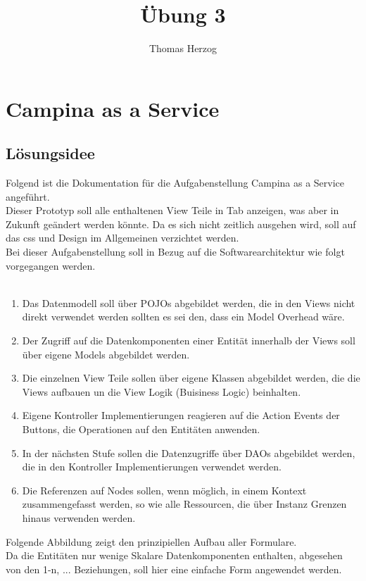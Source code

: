 \documentclass[11pt, a4paper, twoside]{article}   	%
\title{Übung 3}
\author{Thomas Herzog}
\newcommand{\ideaSection}{Lösungsidee}
\begin{document}
\setlength{\headheight}{15mm}

{\color{myred}
	\section
		{Campina as a Service}
}

\subsection{\ideaSection}
Folgend ist die Dokumentation für die Aufgabenstellung Campina as a Service angeführt. \\
Dieser Prototyp soll alle enthaltenen View Teile in Tab anzeigen, was aber in Zukunft geändert werden könnte. Da es sich nicht zeitlich ausgehen wird, soll auf das css und Design im Allgemeinen verzichtet werden.\\
Bei dieser Aufgabenstellung soll in Bezug auf die Softwarearchitektur wie folgt vorgegangen werden.\\\\
\begin{enumerate}
	\item Das Datenmodell soll über POJOs abgebildet werden, die in den Views nicht direkt verwendet werden sollten es sei den, dass ein Model Overhead wäre.
	\item Der Zugriff auf die Datenkomponenten einer Entität innerhalb der Views soll über eigene Models abgebildet werden.
	\item Die einzelnen View Teile sollen über eigene Klassen abgebildet werden, die die Views aufbauen un die View Logik (Buisiness Logic) beinhalten.
	\item Eigene Kontroller Implementierungen reagieren auf die Action Events der Buttons, die Operationen auf den Entitäten anwenden. 
	\item In der nächsten Stufe sollen die Datenzugriffe über DAOs abgebildet werden, die in den Kontroller Implementierungen verwendet werden.
	\item Die Referenzen auf Nodes sollen, wenn möglich, in einem Kontext zusammengefasst werden, so wie alle Ressourcen, die über Instanz Grenzen hinaus verwenden werden.
\end{enumerate}
Folgende Abbildung zeigt den prinzipiellen Aufbau aller Formulare.\\
Da die Entitäten nur wenige Skalare Datenkomponenten enthalten, abgesehen von den 1-n, ... Beziehungen, soll hier eine einfache Form angewendet werden.\\
\end{document}
